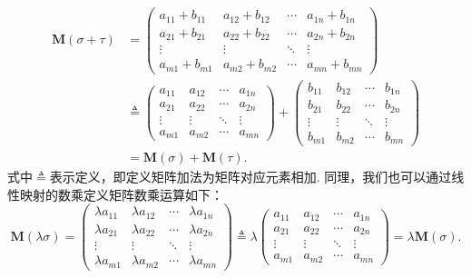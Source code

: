\begin{align*}
    \mathbf{M}(\sigma+\tau) & =\begin{pmatrix}
                                   a_{11}+b_{11} & a_{12}+b_{12} & \cdots & a_{1n}+b_{1n} \\
                                   a_{21}+b_{21} & a_{22}+b_{22} & \cdots & a_{2n}+b_{2n} \\
                                   \vdots        & \vdots        & \ddots & \vdots        \\
                                   a_{m1}+b_{m1} & a_{m2}+b_{m2} & \cdots & a_{mn}+b_{mn}
                               \end{pmatrix}     \\
                            & \triangleq\begin{pmatrix}
                                            a_{11} & a_{12} & \cdots & a_{1n} \\
                                            a_{21} & a_{22} & \cdots & a_{2n} \\
                                            \vdots & \vdots & \ddots & \vdots \\
                                            a_{m1} & a_{m2} & \cdots & a_{mn}
                                        \end{pmatrix} + \begin{pmatrix}
                                                            b_{11} & b_{12} & \cdots & b_{1n} \\
                                                            b_{21} & b_{22} & \cdots & b_{2n} \\
                                                            \vdots & \vdots & \ddots & \vdots \\
                                                            b_{m1} & b_{m2} & \cdots & b_{mn}
                                                        \end{pmatrix} \\
                            & =\mathbf{M}(\sigma)+\mathbf{M}(\tau).
\end{align*}
式中$\triangleq$表示定义，即定义矩阵加法为矩阵对应元素相加. 同理，我们也可以通过线性映射的数乘定义矩阵数乘运算如下：
\[\mathbf{M}(\lambda\sigma)=\begin{pmatrix}
        \lambda a_{11} & \lambda a_{12} & \cdots & \lambda a_{1n} \\
        \lambda a_{21} & \lambda a_{22} & \cdots & \lambda a_{2n} \\
        \vdots         & \vdots         & \ddots & \vdots         \\
        \lambda a_{m1} & \lambda a_{m2} & \cdots & \lambda a_{mn}
    \end{pmatrix}\triangleq\lambda\begin{pmatrix}
        a_{11} & a_{12} & \cdots & a_{1n} \\
        a_{21} & a_{22} & \cdots & a_{2n} \\
        \vdots & \vdots & \ddots & \vdots \\
        a_{m1} & a_{m2} & \cdots & a_{mn}
    \end{pmatrix}=\lambda\mathbf{M}(\sigma).\]
